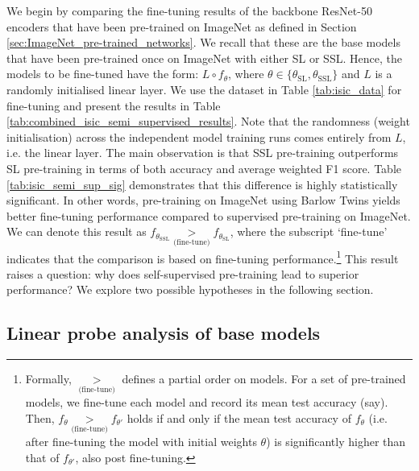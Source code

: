 \documentclass[a4paper,fleqn]{cas-dc}
\begin{document}
We begin by comparing the fine-tuning results of the backbone ResNet-50 encoders that have been pre-trained on ImageNet as defined in Section \ref{sec:ImageNet_pre-trained_networks}. We recall that these are the base models that have been pre-trained once on ImageNet with either SL or SSL. Hence, the models to be fine-tuned have the form: $L \circ f_\theta$, where $\theta \in \{\theta_{\text{SL}}, \theta_{\text{SSL}} \}$ and $L$ is a randomly initialised linear layer. We use the  dataset in Table \ref{tab:isic_data} for fine-tuning  and present the results  in Table \ref{tab:combined_isic_semi_supervised_results}. Note that the randomness  (weight initialisation) across the independent model training runs comes entirely from $L$, i.e. the linear layer. 
\enlargethispage{-\baselineskip}
The main observation is that SSL pre-training outperforms SL pre-training in terms of both accuracy and average weighted F1 score. Table \ref{tab:isic_semi_sup_sig} demonstrates that this difference is highly statistically significant. In other words, pre-training on ImageNet using Barlow Twins yields better fine-tuning performance compared to supervised pre-training on ImageNet. We can denote this result as $f_{\theta_{\scriptscriptstyle\text{SSL}}}\underset{\scriptscriptstyle\text{(fine-tune)}}{>} f_{\theta_{\scriptscriptstyle\text{SL}}}$, where the subscript `fine-tune' indicates that the comparison is based on fine-tuning performance.\footnote{Formally, $\underset{\scriptscriptstyle\text{(fine-tune)}}{>}$ defines a partial order on models. For a set of pre-trained models, we fine-tune each model and record its mean test accuracy (say). Then, $f_{\theta}\underset{\scriptscriptstyle\text{(fine-tune)}}{>} f_{\theta'}$ holds if and only if the mean test accuracy of $f_{\theta}$ (i.e. after fine-tuning the model with initial weights $\theta$) is significantly higher than that of $f_{\theta'}$, also post fine-tuning.} 
This result raises a question: why does self-supervised pre-training lead to superior performance? We explore two possible hypotheses in the following section.


\subsection{Linear probe analysis of base models}
\end{document}
